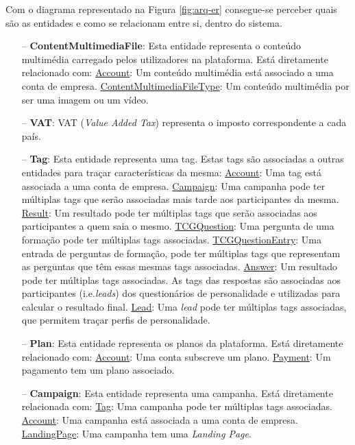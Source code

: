 Com o diagrama representado na Figura \ref{fig:arq-er} consegue-se perceber quais são as entidades e como se relacionam entre si, dentro do sistema.

\begin{itemize}
	\item[--] \textbf{ContentMultimediaFile}: Esta entidade representa o conteúdo multimédia carregado pelos utilizadores na plataforma. Está diretamente relacionado com:
	\subitem \underline{Account}: Um conteúdo multimédia está associado a uma conta de empresa.
	\subitem \underline{ContentMultimediaFileType}: Um conteúdo multimédia por ser uma imagem ou um vídeo.
	\item[--] \textbf{VAT}: VAT (\textit{Value Added Tax}) representa o imposto correspondente a cada país.
	\item[--] \textbf{Tag}: Esta entidade representa uma tag. Estas tags são associadas a outras entidades para traçar características da mesma:
	\subitem \underline{Account}: Uma tag está associada a uma conta de empresa.
	\subitem \underline{Campaign}: Uma campanha pode ter múltiplas tags que serão associadas mais tarde aos participantes da mesma.
	\subitem \underline{Result}: Um resultado pode ter múltiplas tags que serão associadas aos participantes a quem saia o mesmo.
	\subitem \underline{TCGQuestion}: Uma pergunta de uma formação pode ter múltiplas tags associadas.
	\subitem \underline{TCGQuestionEntry}: Uma entrada de perguntas de formação, pode ter múltiplas tags que representam as perguntas que têm essas mesmas tags associadas.
	\subitem \underline{Answer}: Um resultado pode ter múltiplas tags associadas. As tags das respostas são associadas aos participantes (i.e.\textit{leads}) dos questionários de personalidade e utilizadas para calcular o resultado final.
	\subitem \underline{Lead}: Uma \textit{lead} pode ter múltiplas tags associadas, que permitem traçar perfis de personalidade.
	\item[--] \textbf{Plan}: Esta entidade representa os planos da plataforma. Está diretamente relacionado com:
	\subitem \underline{Account}: Uma conta subscreve um plano.
	\subitem \underline{Payment}: Um pagamento tem um plano associado.
	\item[--] \textbf{Campaign}: Esta entidade representa uma campanha.  Está diretamente relacionada com:
	\subitem \underline{Tag}: Uma campanha pode ter múltiplas tags associadas.
	\subitem \underline{Account}: Uma campanha está associada a uma conta de empresa.
	\subitem \underline{LandingPage}: Uma campanha tem uma \textit{Landing Page}.

\end{itemize}
